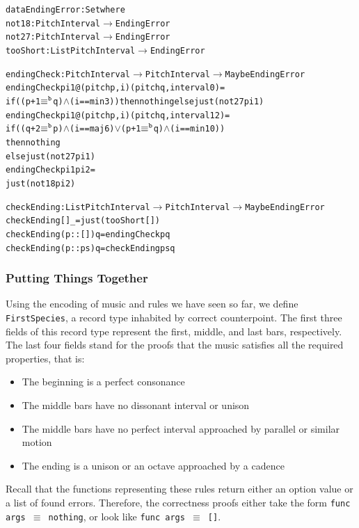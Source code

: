 \begin{alltt}
data EndingError : Set where
  not18    : PitchInterval \(\rightarrow\) EndingError
  not27    : PitchInterval \(\rightarrow\) EndingError
  tooShort : List PitchInterval \(\rightarrow\) EndingError

endingCheck : PitchInterval \(\rightarrow\) PitchInterval \(\rightarrow\) Maybe EndingError
endingCheck pi1@(pitch p , i) (pitch q , interval 0)  = 
  if ((p + 1 \(\equiv\sp{\mathtt{b}}\) q) \(\wedge\) (i == min3)) then nothing else just (not27 pi1)
endingCheck pi1@(pitch p , i) (pitch q , interval 12) =
  if ((q + 2 \(\equiv\sp{\mathtt{b}}\) p) \(\wedge\) (i == maj6) \(\vee\) (p + 1 \(\equiv\sp{\mathtt{b}}\) q) \(\wedge\) (i == min10))
  then nothing
  else just (not27 pi1)
endingCheck pi1               pi2                     =
  just (not18 pi2)

checkEnding : List PitchInterval \(\rightarrow\) PitchInterval \(\rightarrow\) Maybe EndingError
checkEnding []        \_ = just (tooShort [])
checkEnding (p :: []) q = endingCheck p q
checkEnding (p :: ps) q = checkEnding ps q
\end{alltt}

\subsubsection{Putting Things Together}

Using the encoding of music and rules we have seen so far, we define
\texttt{FirstSpecies}, a record type inhabited by correct counterpoint.
The first three fields of this record type represent the first, middle,
and last bars, respectively.
The last four fields stand for the proofs that the music satisfies all
the required properties, that is:

\begin{itemize}
  \item The beginning is a perfect consonance
  \item The middle bars have no dissonant interval or unison
  \item The middle bars have no perfect interval approached by
    parallel or similar motion
  \item The ending is a unison or an octave approached by a cadence
\end{itemize}

\noindent Recall that the functions representing these rules return
either an option value or a list of found errors.
Therefore, the correctness proofs either take the form
\texttt{func args $\equiv$ nothing}, or look like
\texttt{func args $\equiv$ []}.

